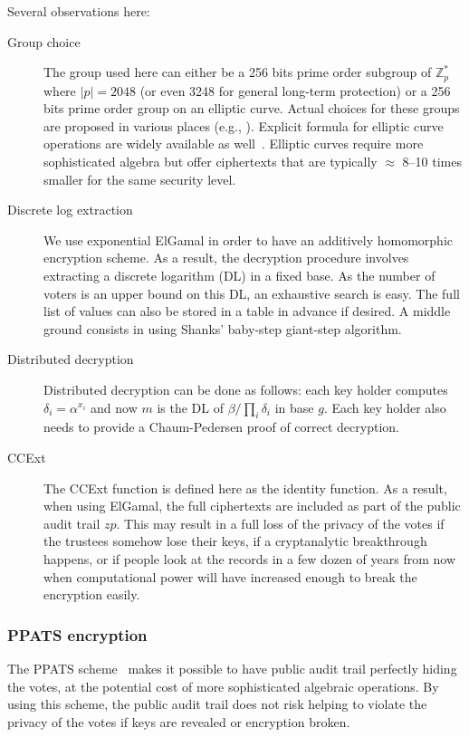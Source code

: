 \documentclass[prodmode]{acmsmall}
\newcommand{\zp}{\ensuremath{zp}\xspace}
\begin{document}
Several observations here: 
\begin{description}
\item[Group choice] The group used here can either be a 256 bits prime
  order subgroup of $\mathbb{Z}_p^*$ where $|p| = 2048$ (or even 3248
  for general long-term protection) or a 256 bits prime order group on
  an elliptic curve. Actual choices for these groups are proposed in
  various places (e.g., \cite{rfc5114,dss}). Explicit formula for
  elliptic curve operations are widely available as
  well~\cite{hyperelliptic}. Elliptic curves require more
  sophisticated algebra but offer ciphertexts that are typically
  $\approx$ 8--10 times smaller for the same security level.
\item[Discrete log extraction] We use exponential ElGamal in order to
  have an additively homomorphic encryption scheme. As a result, the
  decryption procedure involves extracting a discrete logarithm (DL)
  in a fixed base. As the number of voters is an upper bound on this
  DL, an exhaustive search is easy. The full list of values can also
  be stored in a table in advance if desired. A middle ground consists
  in using Shanks' baby-step giant-step algorithm. 
\item[Distributed decryption] Distributed decryption can be done as
  follows: each key holder computes $\delta_i = \alpha^{x_i}$ and now
  $m$ is the DL of $\beta/\prod_i \delta_i$ in base $g$. Each key
  holder also needs to provide a Chaum-Pedersen proof of correct
  decryption. 
\item[\textsf{CCExt}] The \textsf{CCExt} function is defined here as
  the identity function. As a result, when using ElGamal, the full
  ciphertexts are included as part of the public audit trail \zp. This
  may result in a full loss of the privacy of the votes if the
  trustees somehow lose their keys, if a cryptanalytic breakthrough
  happens, or if people look at the records in a few dozen of years
  from now when computational power will have increased enough to
  break the encryption easily.
\end{description}

\subsubsection{PPATS encryption}
\label{sec:ppats-encryption}

The PPATS scheme~\cite{CPP13} makes it possible to have public audit trail
perfectly hiding the votes, at the potential cost of more
sophisticated algebraic operations. By using this scheme, the public
audit trail does not risk helping to violate the privacy of the votes
if keys are revealed or encryption broken.
\end{document}
